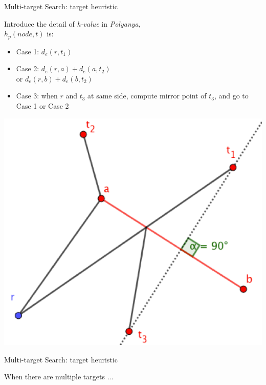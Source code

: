 \begin{frame}{Multi-target Search: target heuristic}
\begin{minipage}{.6\textwidth}
\small{Introduce the detail of \textit{h-value} in \textit{Polyanya},\\
$h_p(node, t)$ is}:
\begin{itemize}
    \item \small{
        Case 1: $d_e(r, t_1)$
    }
    \item \small{
        Case 2: $d_e(r, a) + d_e(a, t_2)$\\
         or $d_e(r, b) + d_e(b, t_2)$
    }
    \item \small{
        Case 3: when $r$ and $t_3$ at same side, compute mirror point of $t_3$, and go to Case 1 or Case 2
    }
\end{itemize}

\end{minipage}%
\begin{minipage}{.4\textwidth}
    \begin{adjustbox}{max totalsize={.9\textwidth}{.9\textheight}, right}
    \centering
    \includegraphics{pic/ef.png}
    \end{adjustbox}
\end{minipage}
\end{frame}

\begin{frame}{Multi-target Search: target heuristic}
\begin{minipage}{\textwidth}
\small{
When there are multiple targets ...
}
\end{minipage}%
\end{frame}

